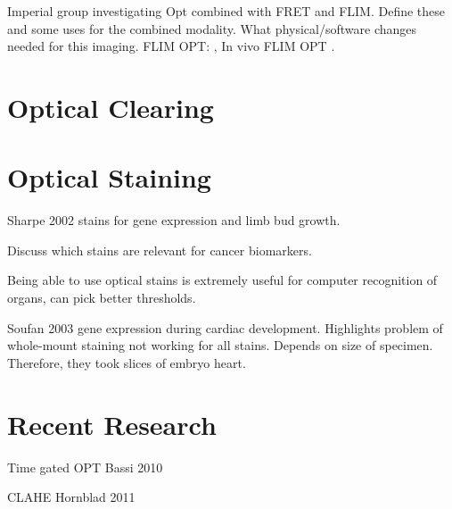 \documentclass[12pt]{article}
\begin{document}
Imperial group investigating Opt combined with FRET and FLIM. Define these and some uses for the combined modality. What physical/software changes needed for this imaging.
FLIM OPT: \cite{McGinty:2008ix}, In vivo FLIM OPT \cite{McGinty:2011vm}.

\newpage
\section{Optical Clearing}
\label{sec:clearing}




\section{Optical Staining}
Sharpe 2002 stains for gene expression and limb bud growth. 

Discuss which stains are relevant for cancer biomarkers. \cite{Hanahan:2011gua}

Being able to use optical stains is extremely useful for computer recognition of organs, can pick better thresholds. \cite{Sharpe:2003cm}

Soufan 2003 \cite{Soufan:2003cd} gene expression during cardiac development. 
Highlights problem of whole-mount staining not working for all stains. Depends on size of specimen. Therefore, they took slices of embryo heart.


\section{Recent Research}
 Time gated OPT Bassi 2010 \cite{Bassi:2010}
 
 CLAHE Hornblad 2011 \cite{Hornblad:2011fh}



\end{document}
